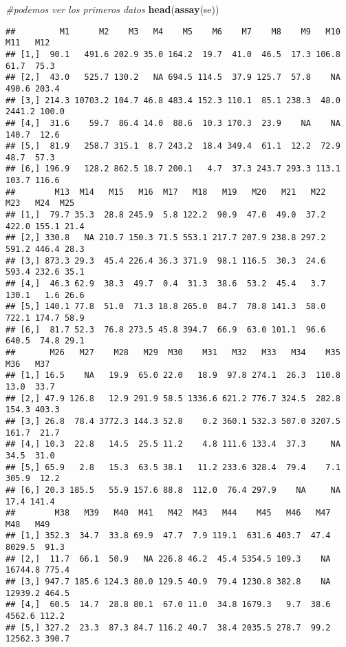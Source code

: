 \documentclass[
]{article}
\newenvironment{Shaded}{\begin{snugshade}}{\end{snugshade}}
\newcommand{\CommentTok}[1]{\textcolor[rgb]{0.56,0.35,0.01}{\textit{#1}}}
\newcommand{\FunctionTok}[1]{\textcolor[rgb]{0.13,0.29,0.53}{\textbf{#1}}}
\newcommand{\NormalTok}[1]{#1}
\begin{document}
\begin{Shaded}
\begin{Highlighting}[]
\CommentTok{\#podemos ver los primeros datos}
\FunctionTok{head}\NormalTok{(}\FunctionTok{assay}\NormalTok{(se))}
\end{Highlighting}
\end{Shaded}

\begin{verbatim}
##         M1      M2    M3   M4    M5    M6    M7    M8    M9   M10    M11   M12
## [1,]  90.1   491.6 202.9 35.0 164.2  19.7  41.0  46.5  17.3 106.8   61.7  75.3
## [2,]  43.0   525.7 130.2   NA 694.5 114.5  37.9 125.7  57.8    NA  490.6 203.4
## [3,] 214.3 10703.2 104.7 46.8 483.4 152.3 110.1  85.1 238.3  48.0 2441.2 100.0
## [4,]  31.6    59.7  86.4 14.0  88.6  10.3 170.3  23.9    NA    NA  140.7  12.6
## [5,]  81.9   258.7 315.1  8.7 243.2  18.4 349.4  61.1  12.2  72.9   48.7  57.3
## [6,] 196.9   128.2 862.5 18.7 200.1   4.7  37.3 243.7 293.3 113.1  103.7 116.6
##        M13  M14   M15   M16  M17   M18   M19   M20   M21   M22   M23   M24  M25
## [1,]  79.7 35.3  28.8 245.9  5.8 122.2  90.9  47.0  49.0  37.2 422.0 155.1 21.4
## [2,] 330.8   NA 210.7 150.3 71.5 553.1 217.7 207.9 238.8 297.2 591.2 446.4 28.3
## [3,] 873.3 29.3  45.4 226.4 36.3 371.9  98.1 116.5  30.3  24.6 593.4 232.6 35.1
## [4,]  46.3 62.9  38.3  49.7  0.4  31.3  38.6  53.2  45.4   3.7 130.1   1.6 26.6
## [5,] 140.1 77.8  51.0  71.3 18.8 265.0  84.7  78.8 141.3  58.0 722.1 174.7 58.9
## [6,]  81.7 52.3  76.8 273.5 45.8 394.7  66.9  63.0 101.1  96.6 640.5  74.8 29.1
##       M26   M27    M28   M29  M30    M31   M32   M33   M34    M35   M36   M37
## [1,] 16.5    NA   19.9  65.0 22.0   18.9  97.8 274.1  26.3  110.8  13.0  33.7
## [2,] 47.9 126.8   12.9 291.9 58.5 1336.6 621.2 776.7 324.5  282.8 154.3 403.3
## [3,] 26.8  78.4 3772.3 144.3 52.8    0.2 360.1 532.3 507.0 3207.5 161.7  21.7
## [4,] 10.3  22.8   14.5  25.5 11.2    4.8 111.6 133.4  37.3     NA  34.5  31.0
## [5,] 65.9   2.8   15.3  63.5 38.1   11.2 233.6 328.4  79.4    7.1 305.9  12.2
## [6,] 20.3 185.5   55.9 157.6 88.8  112.0  76.4 297.9    NA     NA  17.4 141.4
##        M38   M39   M40  M41   M42  M43   M44    M45   M46   M47     M48   M49
## [1,] 352.3  34.7  33.8 69.9  47.7  7.9 119.1  631.6 403.7  47.4  8029.5  91.3
## [2,]  11.7  66.1  50.9   NA 226.8 46.2  45.4 5354.5 109.3    NA 16744.8 775.4
## [3,] 947.7 185.6 124.3 80.0 129.5 40.9  79.4 1230.8 382.8    NA 12939.2 464.5
## [4,]  60.5  14.7  28.8 80.1  67.0 11.0  34.8 1679.3   9.7  38.6  4562.6 112.2
## [5,] 327.2  23.3  87.3 84.7 116.2 40.7  38.4 2035.5 278.7  99.2 12562.3 390.7

\end{verbatim}
\end{document}
